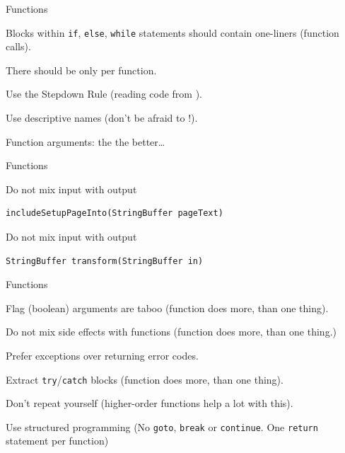 \begin{frame}{Functions}
\begin{center}
Blocks within \lstinline!if!, \lstinline!else!, \lstinline!while! statements
should contain one-liners (function calls).
\end{center}
\begin{center}
There should be only  per function.
\end{center}
\begin{center}
Use the Stepdown Rule (reading code from ).
\end{center}
\begin{center}
Use descriptive names (don't be afraid to !).
\end{center}
\begin{center}
Function arguments: the  the better\ldots
\end{center}
\end{frame}

\begin{frame}[fragile]{Functions}
\begin{alertblock}{Do not mix input with output}
\begin{lstlisting}
includeSetupPageInto(StringBuffer pageText)
\end{lstlisting}
\end{alertblock}
\begin{exampleblock}{Do not mix input with output}
\begin{lstlisting}
StringBuffer transform(StringBuffer in)
\end{lstlisting}
\end{exampleblock}
\end{frame}

\begin{frame}{Functions}
\begin{center}
\alert{Flag (boolean) arguments are taboo} (function does more, than one thing).
\end{center}
\begin{center}
Do not mix \alert{side effects} with  functions
(function does more, than one thing.)
\end{center}
\begin{center}
Prefer exceptions over returning error codes.
\end{center}
\begin{center}
Extract \lstinline!try!/\lstinline!catch! blocks (function does more, than one
thing).
\end{center}
\begin{center}
Don't repeat yourself (higher-order functions help a lot with this).
\end{center}
\begin{center}
Use structured programming (No \lstinline!goto!, \lstinline!break! or
\lstinline!continue!. One \lstinline!return! statement per function)
\end{center}
\end{frame}

